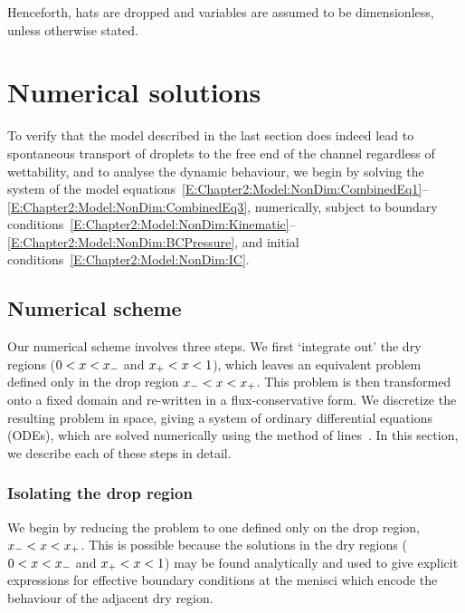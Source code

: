 Henceforth, hats are dropped and variables are assumed to be dimensionless, unless otherwise stated.


\section{Numerical solutions}
To verify that the model described in the last section does indeed lead to spontaneous transport of droplets to the free end of the channel regardless of wettability, and to analyse the dynamic behaviour, we begin by solving the system of the model equations~\eqref{E:Chapter2:Model:NonDim:CombinedEq1}--\eqref{E:Chapter2:Model:NonDim:CombinedEq3}, numerically, subject to boundary conditions~\eqref{E:Chapter2:Model:NonDim:Kinematic}--\eqref{E:Chapter2:Model:NonDim:BCPressure}, and initial conditions~\eqref{E:Chapter2:Model:NonDim:IC}.
\subsection{Numerical scheme}\label{S:Ch2:Numerics:Scheme}
Our numerical scheme involves three steps. We first `integrate out' the dry regions ($0 < x < x_{-}$ and $x_{+} < x < 1$), which leaves an equivalent problem defined only in the drop region $x_{-} < x < x_{+}$. This problem is then transformed onto a fixed domain and re-written in a flux-conservative form. We discretize the resulting problem in space, giving a system of ordinary differential equations (ODEs), which are solved numerically using the method of lines~\citep{Schiesser1991}. In this section, we describe each of these steps in detail.

\subsubsection{Isolating the drop region}\label{S:Ch2:Numerics:Scheme:ReducedProblem}
We begin by reducing the problem to one defined only on the drop region, $x_{-} < x < x_{+}$. This is possible because the solutions in the dry regions ($0 < x < x_{-}$ and $x_{+} < x < 1$) may be found analytically and used to give explicit expressions for effective boundary conditions at the menisci which encode the behaviour of the adjacent dry region.

